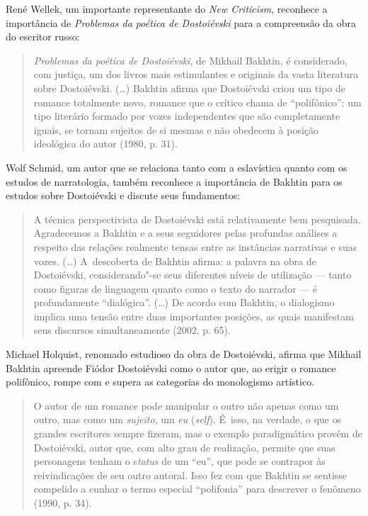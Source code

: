 René Wellek, um importante representante do \emph{New Criticism},
reconhece a importância de \emph{Problemas da poética de Dostoiévski}
para a compreensão da obra do escritor russo:

\begin{quote}
\emph{Problemas da poética de Dostoiévski}, de Mikhail Bakhtin, é
considerado, com justiça, um dos livros mais estimulantes e originais da
vasta literatura sobre Dostoiévski. (\ldots) Bakhtin afirma que Dostoiévski
criou um tipo de romance totalmente novo, romance que o crítico chama de
``polifônico'': um tipo literário formado por vozes independentes que
são completamente iguais, se tornam sujeitos de si mesmas e não obedecem
à posição ideológica do autor (1980, p. 31).
\end{quote}

Wolf Schmid, um autor que se relaciona tanto com a eslavística quanto
com os estudos de narratologia, também reconhece a importância de
Bakhtin para os estudos sobre Dostoiévski e discute seus fundamentos:

\begin{quote}
A técnica perspectivista de Dostoiévski está relativamente bem
pesquisada. Agradecemos a Bakhtin e a seus seguidores pelas profundas
análises a respeito das relações realmente tensas entre as instâncias
narrativas e suas vozes. (\ldots) A~descoberta de Bakhtin afirma: a palavra
na obra de Dostoiévski, considerando"-se seus diferentes níveis de
utilização --- tanto como figuras de linguagem quanto como o texto do
narrador --- é profundamente ``dialógica''. (\ldots) De acordo com Bakhtin,
o dialogismo implica uma tensão entre duas importantes posições, as
quais manifestam seus discursos simultaneamente (2002, p. 65).
\end{quote}

Michael Holquist, renomado estudioso da obra de Dostoiévski, afirma que
Mikhail Bakhtin apreende Fiódor Dostoiévski como o autor que, ao erigir
o romance polifônico, rompe com e supera as categorias do monologismo
artístico.

\begin{quote}
O autor de um romance pode manipular o outro não apenas como um outro,
mas como um \emph{sujeito}, um \emph{eu} (\emph{self}). É~isso, na
verdade, o que os grandes escritores sempre fizeram, mas o exemplo
paradigmático provém de Dostoiévski, autor que, com alto grau de
realização, permite que suas personagens tenham o s\emph{tatus} de um
``eu'', que pode se contrapor às reivindicações de seu outro autoral.
Isso fez com que Bakhtin se sentisse compelido a cunhar o termo especial
``polifonia'' para descrever o fenômeno (1990, p. 34).
\end{quote}

